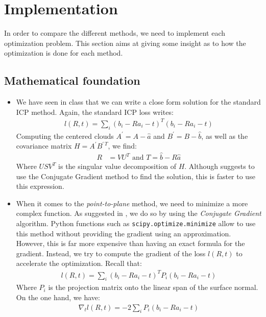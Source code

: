 \documentclass[11pt,letterpaper,leqno]{article}
\begin{document}
\section{Implementation}
In order to compare the different methods, we need to implement each optimization problem. This section aims at giving some insight as to how the optimization is done for each method.

\subsection{Mathematical foundation} \label{sec:mathfoundation}
\begin{itemize}
    \item We have seen in class that we can write a close form solution for the standard ICP method. Again, the standard ICP loss writes:
    \begin{align*}
        l(R,t) = \sum_i  (b_i - R a_i -t)^T (b_i - R a_i -t)
    \end{align*}
    Computing the centered clouds $A^\prime = A - \hat{a}$ and $B^\prime = B - \hat{b}$, as well as the covariance matrix $H = A^\prime B^{\prime \, T}$, we find:
    \begin{align}
        R &= VU^T \text{ and } T = \hat{b} - R \hat{a} \label{eq:icp}
    \end{align}
    Where $USV^T$ is the singular value decomposition of $H$. Although \cite{generalized-icp} suggests to use the Conjugate Gradient method to find the solution, this is faster to use this expression.
    \item When it comes to the \textit{point-to-plane} method, we need to minimize a more complex function. As suggested in \cite{generalized-icp}, we do so by using the \textit{Conjugate Gradient} algorithm. Python functions such as \texttt{scipy.optimize.minimize} allow to use this method without providing the gradient using an approximation. However, this is far more expensive than having an exact formula for the gradient. Instead, we try to compute the gradient of the loss $l(R,t)$ to accelerate the optimization. Recall that:
    \begin{align*}
        l(R,t) = \sum_i (b_i - R a_i -t)^T P_i (b_i - R a_i -t)
    \end{align*}
    Where $P_i$ is the projection matrix onto the linear span of the surface normal. On the one hand, we have:
    \begin{align}
        \nabla_t l(R,t) = - 2 \sum_i P_i (b_i - R a_i -t)
    \end{align}

\end{itemize}
\end{document}
